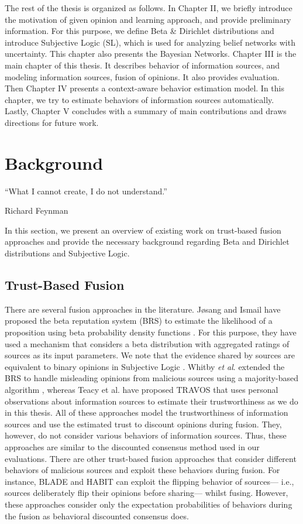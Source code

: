 \documentclass[a4,12pt]{ozu-thesis}
\begin{document}
The rest of the thesis is organized as follows. In Chapter II, we briefly introduce the motivation of given opinion and learning approach, and provide preliminary information. For this purpose, we define Beta \& Dirichlet distributions and introduce Subjective Logic (SL), which is used for analyzing belief networks with uncertainty. This chapter also presents the Bayesian Networks. Chapter III is the main chapter of this thesis. It describes behavior of information sources, and modeling information sources, fusion of opinions. It also provides evaluation. Then Chapter IV presents a context-aware behavior estimation model. In this chapter, we try to estimate behaviors of information sources automatically. Lastly, Chapter V concludes with a summary of main contributions and draws directions for future work.


\chapter{Background}
\epigraph{``What I cannot create, I do not understand.''}{Richard Feynman}
In this section, we present an overview of existing work on trust-based fusion approaches and provide the necessary background regarding Beta and Dirichlet distributions and Subjective Logic.

\section{Trust-Based Fusion }
There are several fusion approaches in the literature. J{\o}sang and Ismail have proposed the beta reputation system (BRS) to estimate the likelihood of a proposition using beta probability density functions \cite{commerce2002beta}. For this purpose, they have used a mechanism that considers a beta distribution with aggregated ratings of sources as its input parameters. We note that the evidence shared by sources are equivalent to binary opinions in Subjective Logic \cite{josang2011subjective}. Whitby {\it et al}. extended the BRS to handle misleading opinions from malicious sources using a majority-based algorithm \cite{whitby2004filtering}, whereas Teacy et al. have proposed TRAVOS \cite{teacy2006travos} that uses personal observations about information sources to estimate their trustworthiness as we do in this thesis. All of these approaches model the trustworthiness of information sources and use the estimated trust to discount opinions during fusion. They, however, do not consider various behaviors of information sources. Thus, these approaches are similar to the discounted consensus method used in our evaluations. There are other trust-based fusion approaches that consider different behaviors of malicious sources and exploit these behaviors during fusion. For instance, BLADE \cite{regan2006bayesian} and HABIT \cite{teacy2012efficient} can exploit the flipping behavior of sources— i.e., sources deliberately flip their opinions before sharing— whilst fusing. However, these approaches consider only the expectation probabilities of behaviors during the fusion as behavioral discounted consensus does. 
\end{document}

